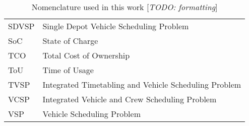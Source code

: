 \documentclass[]{article}
\newcommand{\todo}[1]{{\color{red}[\textit{TODO: #1}]}}
\begin{document}
\begin{table}
\begin{tabular}{ll}
    SDVSP                                     & Single Depot Vehicle Scheduling Problem               \\
    SoC                                       & State of Charge                                       \\
    TCO                                       & Total Cost of Ownership                               \\
    ToU                                       & Time of Usage                                         \\
    TVSP                                      & Integrated Timetabling and Vehicle Scheduling Problem \\
    VCSP                                      & Integrated Vehicle and Crew Scheduling Problem        \\
    VSP                                       & Vehicle Scheduling Problem                            \\
    \bottomrule
  \end{tabular}
  \label{tab:nomenclature}
  \caption{Nomenclature used in this work \todo{formatting}}
\end{table}
\end{document}

